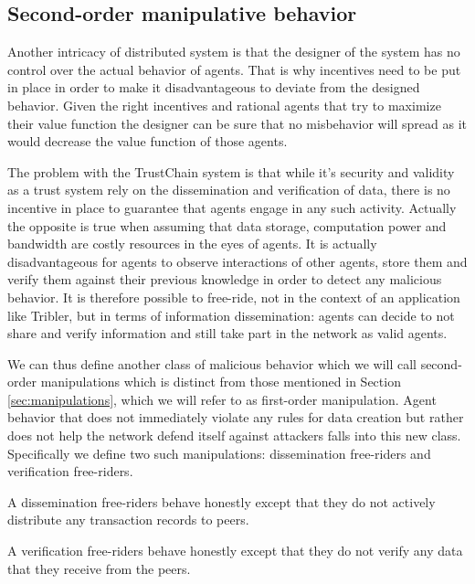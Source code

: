 \subsection{Second-order manipulative behavior}
Another intricacy of distributed system is that the designer of the system has no control over the 
actual behavior of agents. That is why incentives need to be put in place in order to make it disadvantageous
to deviate from the designed behavior. Given the right incentives and rational agents that try to 
maximize their value function the designer can be sure that no misbehavior will spread as it would 
decrease the value function of those agents.

The problem with the TrustChain system is that while it's security and validity as a trust system 
rely on the dissemination and verification of data, there is no incentive in place to guarantee that agents
engage in any such activity. Actually the opposite is true when assuming that data storage, computation power and 
bandwidth are costly resources in the eyes of agents. It is actually disadvantageous for agents to 
observe interactions of other agents, store them and verify them against their previous knowledge in
order to detect any malicious behavior. It is therefore possible to free-ride, not in the context 
of an application like Tribler, but in terms of information dissemination: agents can decide to not 
share and verify information and still take part in the network as valid agents. 

We can thus define another class of malicious behavior which we will call second-order manipulations 
which is distinct from those mentioned in Section \ref{sec:manipulations}, which we will refer to 
as first-order manipulation. Agent behavior that does not immediately violate any rules for data 
creation but rather does not help the network defend itself against attackers falls into this new 
class. Specifically we define two such manipulations: dissemination free-riders and verification 
free-riders.

\begin{defn}
    A dissemination free-riders behave honestly except that they do not actively distribute 
    any transaction records to peers.
\end{defn}

\begin{defn}
    A verification free-riders behave honestly except that they do not verify any data that they 
    receive from the peers.
\end{defn}

